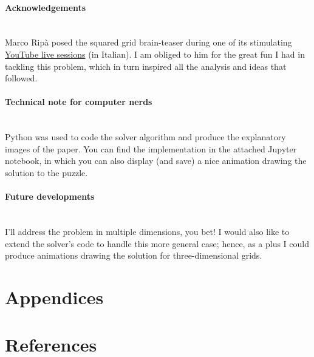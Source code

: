 \documentclass[11pt]{article}
\begin{document}
\paragraph{Acknowledgements} \mbox{} \\ %
Marco Ripà posed the squared grid brain-teaser during one of its stimulating \href{https://www.youtube.com/watch?v=rh-ONRXcHok}{YouTube live sessions} (in Italian). I am obliged to him for the great fun I had in tackling this problem, which in turn inspired all the analysis and ideas that followed.

\paragraph{Technical note for computer nerds} \mbox{} \\
Python was used to code the solver algorithm and produce the explanatory images of the paper. You can find the implementation in the attached Jupyter notebook, in which you can also display (and save) a nice animation drawing the solution to the puzzle.

\paragraph{Future developments} \mbox{} \\
I'll address the problem in multiple dimensions, you bet! I would also like to extend the solver's code to handle this more general case; hence, as a plus I could produce animations drawing the solution for three-dimensional grids.

\hypertarget{appendices}{
	\section{Appendices}
	\label{appendices}
}



\hypertarget{references}{
	\section{References}
	\label{references}
}
\end{document}
